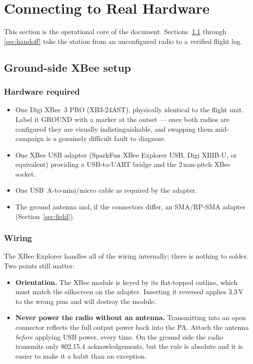 \documentclass[11pt,a4paper]{article}
\begin{document}
\section{Connecting to Real Hardware}
\label{sec:hardware}

This section is the operational core of the document. Sections~\ref{sec:xctu}
through \ref{sec:handoff} take the station from an unconfigured radio to a
verified flight log.

\subsection{Ground-side XBee setup}
\label{sec:xctu}

\subsubsection{Hardware required}

\begin{itemize}
  \item One Digi XBee~3 PRO (XB3-24AST), physically identical to the flight
        unit. Label it \textsf{GROUND} with a marker at the outset --- once
        both radios are configured they are visually indistinguishable, and
        swapping them mid-campaign is a genuinely difficult fault to
        diagnose.
  \item One XBee USB adapter (SparkFun XBee Explorer USB, Digi XBIB-U, or
        equivalent) providing a USB-to-UART bridge and the 2\,mm-pitch XBee
        socket.
  \item One USB~A-to-mini/micro cable as required by the adapter.
  \item The ground antenna and, if the connectors differ, an SMA/RP-SMA
        adapter (Section~\ref{sec:field}).
\end{itemize}

\subsubsection{Wiring}

The XBee Explorer handles all of the wiring internally; there is nothing to
solder. Two points still matter:

\begin{itemize}
  \item \textbf{Orientation.} The XBee module is keyed by its flat-topped
        outline, which must match the silkscreen on the adapter. Inserting it
        reversed applies 3.3\,V to the wrong pins and will destroy the
        module.
  \item \textbf{Never power the radio without an antenna.} Transmitting into
        an open connector reflects the full output power back into the PA.
        Attach the antenna \emph{before} applying USB power, every time. On
        the ground side the radio transmits only 802.15.4 acknowledgements,
        but the rule is absolute and it is easier to make it a habit than an
        exception.
\end{itemize}
\end{document}
